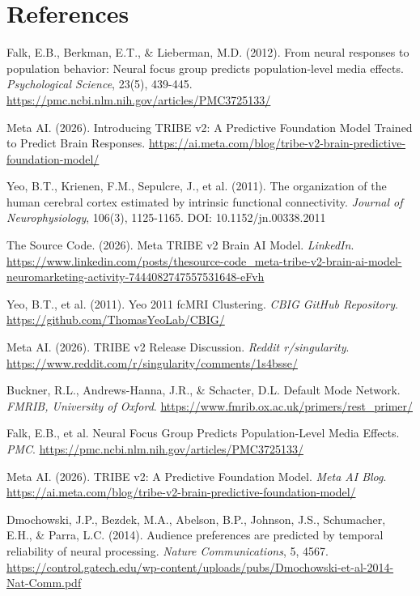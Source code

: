 \documentclass[11pt,letterpaper]{article}
\begin{document}
\section*{References}
\begingroup
\small
\begin{list}{}{\setlength{\leftmargin}{2em}\setlength{\itemindent}{-2em}\setlength{\itemsep}{2pt}}
\item[{[1]}] Falk, E.B., Berkman, E.T., \& Lieberman, M.D. (2012). From neural responses to population behavior: Neural focus group predicts population-level media effects. \textit{Psychological Science}, 23(5), 439-445. \url{https://pmc.ncbi.nlm.nih.gov/articles/PMC3725133/}
\item[{[2]}] Meta AI. (2026). Introducing TRIBE v2: A Predictive Foundation Model Trained to Predict Brain Responses. \url{https://ai.meta.com/blog/tribe-v2-brain-predictive-foundation-model/}
\item[{[3]}] Yeo, B.T., Krienen, F.M., Sepulcre, J., et al. (2011). The organization of the human cerebral cortex estimated by intrinsic functional connectivity. \textit{Journal of Neurophysiology}, 106(3), 1125-1165. DOI: 10.1152/jn.00338.2011
\item[{[4]}] The Source Code. (2026). Meta TRIBE v2 Brain AI Model. \textit{LinkedIn}. \url{https://www.linkedin.com/posts/thesource-code_meta-tribe-v2-brain-ai-model-neuromarketing-activity-7444082747557531648-eFvh}
\item[{[5]}] Yeo, B.T., et al. (2011). Yeo 2011 fcMRI Clustering. \textit{CBIG GitHub Repository}. \url{https://github.com/ThomasYeoLab/CBIG/}
\item[{[6]}] Meta AI. (2026). TRIBE v2 Release Discussion. \textit{Reddit r/singularity}. \url{https://www.reddit.com/r/singularity/comments/1s4bsse/}
\item[{[7]}] Buckner, R.L., Andrews-Hanna, J.R., \& Schacter, D.L. Default Mode Network. \textit{FMRIB, University of Oxford}. \url{https://www.fmrib.ox.ac.uk/primers/rest_primer/}
\item[{[8]}] Falk, E.B., et al. Neural Focus Group Predicts Population-Level Media Effects. \textit{PMC}. \url{https://pmc.ncbi.nlm.nih.gov/articles/PMC3725133/}
\item[{[9]}] Meta AI. (2026). TRIBE v2: A Predictive Foundation Model. \textit{Meta AI Blog}. \url{https://ai.meta.com/blog/tribe-v2-brain-predictive-foundation-model/}
\item[{[10]}] Dmochowski, J.P., Bezdek, M.A., Abelson, B.P., Johnson, J.S., Schumacher, E.H., \& Parra, L.C. (2014). Audience preferences are predicted by temporal reliability of neural processing. \textit{Nature Communications}, 5, 4567. \url{https://control.gatech.edu/wp-content/uploads/pubs/Dmochowski-et-al-2014-Nat-Comm.pdf}

\end{list}
\end{document}
